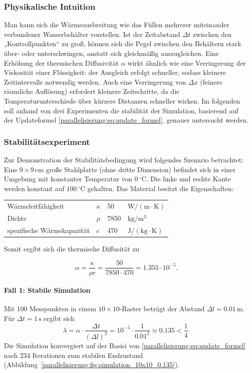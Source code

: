 \subsubsection{Physikalische Intuition}  
Man kann sich die Wärmeausbreitung wie das Füllen mehrerer miteinander verbundener Wasserbehälter vorstellen.  
Ist der Zeitabstand \(\Delta t\) zwischen den „Kontrollpunkten“ zu groß, können sich die Pegel zwischen den Behältern stark über- oder unterschwingen, anstatt sich gleichmäßig auszugleichen.  
Eine Erhöhung der thermischen Diffusivität \(\alpha\) wirkt ähnlich wie eine Verringerung der Viskosität einer Flüssigkeit: der Ausgleich erfolgt schneller, sodass kleinere Zeitintervalle notwendig werden.  
Auch eine Verringerung von \(\Delta x\) (feinere räumliche Auflösung) erfordert kleinere Zeitschritte, da die Temperaturunterschiede über kürzere Distanzen schneller wirken.
Im folgenden soll anhand von drei Experimenten die stabilität der Simulation, basierend auf der Updateformel  \eqref{parallelisierung:eq:update_formel}, genauer untersucht werden.

\subsubsection{Stabilitätsexperiment}

Zur Demonstration der Stabilitätsbedingung wird folgendes Szenario betrachtet:
Eine \(9 \times 9 \, \mathrm{cm}\) große Stahlplatte (ohne dritte Dimension) befindet sich in einer Umgebung mit konstanter Temperatur von \(0\,^{\circ}\mathrm{C}\).  
Die linke und rechte Kante werden konstant auf \(100\,^{\circ}\mathrm{C}\) gehalten.  
Das Material besitzt die Eigenschaften:
\begin{center}
	\begin{tabular}{llll}
		Wärmeleitfähigkeit & \(\kappa\) & 50 &
		\(\mathrm{W/(m \cdot K)}\) \\
		Dichte & \(\rho\)   &  7850 & \(\mathrm{kg/m^3}\) \\
		spezifische Wärmekapazität & \(c\) &  470 & \(\mathrm{J/(kg \cdot K)}\)
	\end{tabular}
\end{center}
Somit ergibt sich die thermische Diffusität zu


\[
\alpha =
\frac{\kappa}{\rho c}
=
\frac{50}{7850 \cdot 470}
= 1.355 \cdot 10^{-5}.
\]

\paragraph{Fall 1: Stabile Simulation}  
Mit \(100\) Messpunkten in einem \(10\times 10\)-Raster beträgt der Abstand \(\Delta l = 0.01\,\mathrm{m}\).  
Für \(\Delta t = 1\,\mathrm{s}\) ergibt sich
\[
\lambda =
\alpha \cdot \frac{\Delta t}{(\Delta l)^2}
=
10^{-5} \cdot \frac{1}{0.01^2}
\approx 0.135 < \frac14.
\]
Die Simulation konvergiert auf der Basisi von \eqref{parallelisierung:eq:update_formel} nach 234 Iterationen zum stabilen Endzustand (Abbildung~\ref{parallelisierung:fig:simulation_10x10_0.135}).

